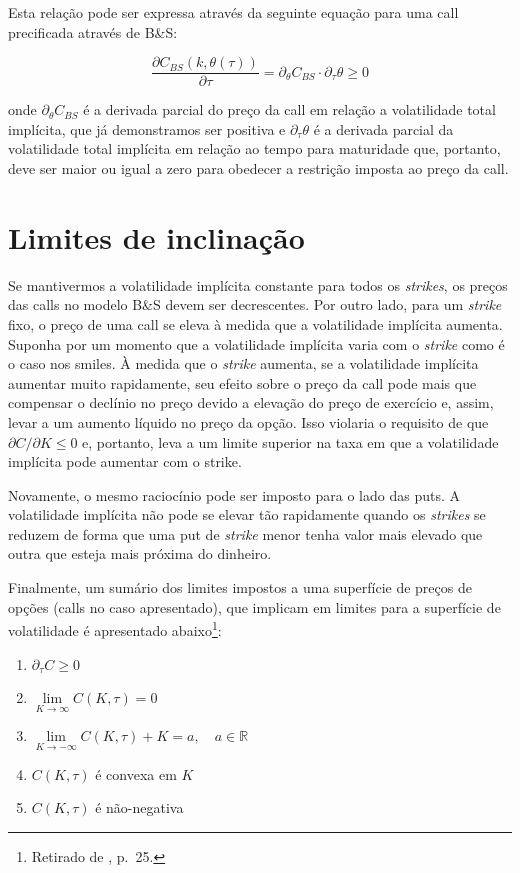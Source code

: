 \documentclass[]{book}
\providecommand{\tightlist}{%
  \setlength{\itemsep}{0pt}\setlength{\parskip}{0pt}}
\let\rmarkdownfootnote\footnote%
\def\footnote{\protect\rmarkdownfootnote}
\theoremstyle{definition}
\theoremstyle{definition}
\theoremstyle{definition}
\theoremstyle{remark}
\begin{document}
Esta relação pode ser expressa através da seguinte equação para uma call precificada através de B\&S:

\begin{equation}
\frac{\partial C_{BS}(k, \theta(\tau))}{\partial \tau}=\partial_\theta C_{BS}\cdot\partial_\tau \theta \geq 0
\label{eq:arbcalendario}
\end{equation}

onde \(\partial_\theta C_{BS}\) é a derivada parcial do preço da call em relação a volatilidade total implícita, que já demonstramos ser positiva e \(\partial_\tau \theta\) é a derivada parcial da volatilidade total implícita em relação ao tempo para maturidade que, portanto, deve ser maior ou igual a zero para obedecer a restrição imposta ao preço da call.

\hypertarget{limites-de-inclinacao}{%
\section{Limites de inclinação}\label{limites-de-inclinacao}}

Se mantivermos a volatilidade implícita constante para todos os \emph{strikes}, os preços das calls no modelo B\&S devem ser decrescentes. Por outro lado, para um \emph{strike} fixo, o preço de uma call se eleva à medida que a volatilidade implícita aumenta. Suponha por um momento que a volatilidade implícita varia com o \emph{strike} como é o caso nos smiles. À medida que o \emph{strike} aumenta, se a volatilidade implícita aumentar muito rapidamente, seu efeito sobre o preço da call pode mais que compensar o declínio no preço devido a elevação do preço de exercício e, assim, levar a um aumento líquido no preço da opção. Isso violaria o requisito de que \(\partial C /\partial K \leq 0\) e, portanto, leva a um limite superior na taxa em que a volatilidade implícita pode aumentar com o strike.

Novamente, o mesmo raciocínio pode ser imposto para o lado das puts. A volatilidade implícita não pode se elevar tão rapidamente quando os \emph{strikes} se reduzem de forma que uma put de \emph{strike} menor tenha valor mais elevado que outra que esteja mais próxima do dinheiro.

Finalmente, um sumário dos limites impostos a uma superfície de preços de opções (calls no caso apresentado), que implicam em limites para a superfície de volatilidade é apresentado abaixo\footnote{Retirado de \citet{Aurell2014}, p.~25.}:

\begin{enumerate}
\def\labelenumi{\arabic{enumi}.}
\tightlist
\item
  \(\partial_\tau C \geq 0\)
\item
  \(\lim\limits_{K\rightarrow\infty}C(K, \tau)=0\)
\item
  \(\lim\limits_{K\rightarrow-\infty}C(K, \tau)+K=a, \quad a \in \mathbb R\)
\item
  \(C(K, \tau)\) é convexa em \(K\)
\item
  \(C(K, \tau)\) é não-negativa
\end{enumerate}
\end{document}
